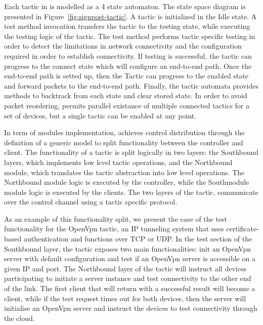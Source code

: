 Each tactic in \signpost is modelled as a 4 state automaton.  The state space
diagram is presented in Figure~\ref{fig:signpost-tactic}. A tactic is
initialized in the Idle state. A test method invocation transfers the tactic to
the testing state, while executing the testing logic of the tactic. The test
method performs tactic specific testing in order to detect the limitations in
network connectivity and the configuration required in order to establish
connectivity. If testing is successful, the tactic can progress to the connect
state which will configure an end-to-end path. Once the end-to-end path is
setted up, then the Tactic can progress to the enabled state and forward packets
to the end-to-end path.  Finally, the tactic automata provides methods to
backtrack from each state and clear stored state. In order to avoid packet
reordering, \signpost permits parallel existance of multiple connected tactics
for a set of devices, but a single tactic can be enabled at any point. 

In term of modules implementation, \signpost achieves control distribution
through the definition of a generic model to split functionality between the
\signpost controller and client.  The functionality of a \signpost tactic
is split logically in two layers: the Southbound layers, which implements low
level tactic operations, and the Northbound module,
which translates the tactic abstraction into low level operations.  The
Northbound module logic is executed by the \signpost controller, while the
Southmodule module logic is executed by the \signpost clients. The two layers of
the tactic, communicate over the control channel using a tactic specific
protocol. 

As an example of this functionality split, we present the case of the test
functionality for the OpenVpn tactic, an IP tunneling system that uses
certificate-based authentication and functions over TCP or UDP. In the test
section of the Southbound layer, the tactic exposes two main functionalities:
init an OpenVpn server with default configuration and test if an OpenVpn server
is accessible on a given IP and port. The Northbound layer of the tactic will
instruct all devices participating to initiate a server instance and test
connectivity to the other end of the link. The first client that will return
with a successful result will become a client, while if the test request times
out for both devices, then the server will initialise an OpenVpn server and
instruct the devices to test connectivity through the cloud.

